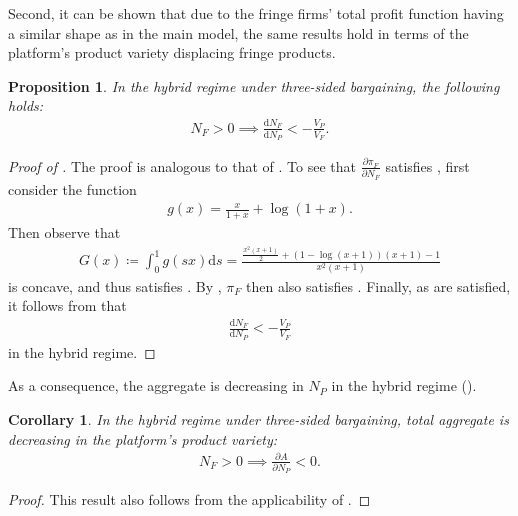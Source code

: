 \documentclass[a4paper]{article}
\newtheorem{proposition}{Proposition}
\newtheorem{corollary}{Corollary}
\newcommand{\dd}{\mathrm{d}}
\newcommand{\ds}{\mathrm{d}s}
\begin{document}
Second, it can be shown that due to the fringe firms' total profit function having a similar shape as in the main model, the same results hold in terms of the platform's product variety displacing fringe products.
\begin{proposition}
    \label{prop:fringe_entry_two_sided}
    In the hybrid regime under three-sided bargaining, the following holds:
    \begin{align*}
        N_F > 0 \implies \frac{\dd N_F}{\dd N_P} < -\frac{V_P}{V_F}.
    \end{align*}
\end{proposition}
\begin{proof}[Proof of ]
    The proof is analogous to that of .
    To see that $\frac{\partial \pi_F}{\partial N_F}$ satisfies , first consider the function
    \begin{align*}
        g(x) = \frac{x}{1 + x} + \log(1 + x).
    \end{align*}
    Then observe that
    \begin{align*}
        G(x) \coloneq \int_0^1 g(sx) \ds = \frac{\frac{x^{2} \left(x + 1\right)}{2} + \left(1 - \log{\left(x + 1 \right)}\right) \left(x + 1\right) - 1}{x^{2} \left(x + 1\right)}
    \end{align*}
    is concave, and thus satisfies .
    By , $\pi_F$ then also satisfies .
    Finally, as  are satisfied, it follows from  that
    \begin{align*}
        \frac{\dd N_F}{\dd N_P} < -\frac{V_P}{V_F}
    \end{align*}
    in the hybrid regime.
    
\end{proof}

As a consequence, the aggregate is decreasing in $N_P$ in the hybrid regime ().
\begin{corollary}
    In the hybrid regime under three-sided bargaining, total aggregate is decreasing in the platform's product variety:
    \begin{align*}
        N_F > 0 \implies \frac{\partial A}{\partial N_P} < 0.
    \end{align*}
\end{corollary}
\begin{proof}
    This result also follows from the applicability of .
\end{proof}
\end{document}

